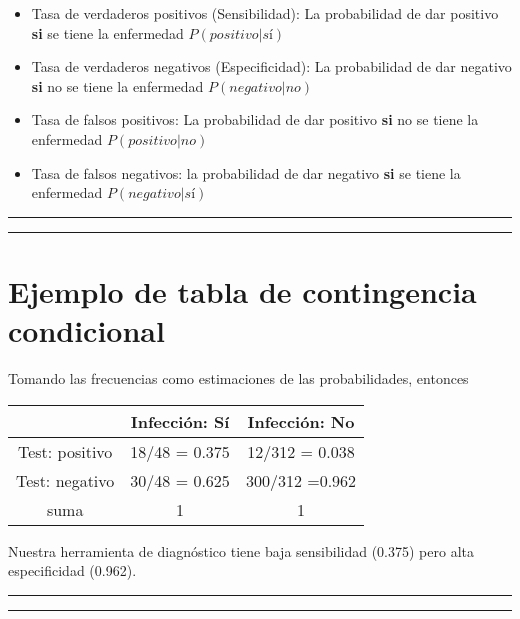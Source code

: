 \documentclass[
]{book}
\begin{document}
\begin{itemize}
\item
  Tasa de verdaderos positivos (Sensibilidad): La probabilidad de dar positivo \textbf{si} se tiene la enfermedad \(P(positivo|sí)\)
\item
  Tasa de verdaderos negativos (Especificidad): La probabilidad de dar negativo \textbf{si} no se tiene la enfermedad \(P(negativo|no)\)
\item
  Tasa de falsos positivos: La probabilidad de dar positivo \textbf{si} no se tiene la enfermedad \(P(positivo|no)\)
\item
  Tasa de falsos negativos: la probabilidad de dar negativo \textbf{si} se tiene la enfermedad \(P(negativo|sí)\)
\end{itemize}

\begin{center}\rule{0.5\linewidth}{0.5pt}\end{center}

\begin{center}\rule{0.5\linewidth}{0.5pt}\end{center}

\hypertarget{ejemplo-de-tabla-de-contingencia-condicional}{%
\section{Ejemplo de tabla de contingencia condicional}\label{ejemplo-de-tabla-de-contingencia-condicional}}

Tomando las frecuencias como estimaciones de las probabilidades, entonces

\begin{longtable}[]{@{}ccc@{}}
\toprule
& Infección: Sí & Infección: No \\
\midrule
\endhead
Test: positivo & 18/48 = 0.375 & 12/312 = 0.038 \\
Test: negativo & 30/48 = 0.625 & 300/312 =0.962 \\
suma & 1 & 1 \\
\bottomrule
\end{longtable}

Nuestra herramienta de diagnóstico tiene baja sensibilidad (0.375) pero alta
especificidad (0.962).

\begin{center}\rule{0.5\linewidth}{0.5pt}\end{center}

\begin{center}\rule{0.5\linewidth}{0.5pt}\end{center}
\end{document}

